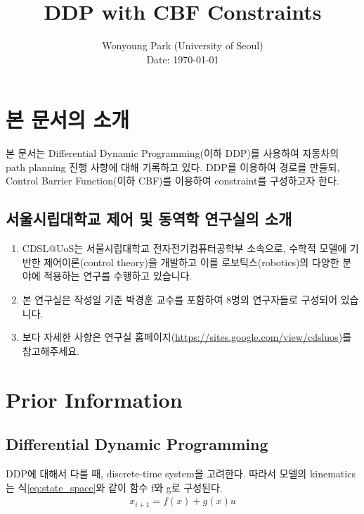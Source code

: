 \documentclass[journal]{IEEEtran}
\begin{document}
\title{DDP with CBF Constraints}

\author{Wonyoung Park (University of Seoul)\\ 
        Date: \today
        }

\maketitle

\section{본 문서의 소개}
본 문서는 Differential Dynamic Programming(이하 DDP)를 사용하여 자동차의 path planning 진행 사항에 대해 기록하고 있다. DDP를 이용하여 경로를 만들되, Control Barrier Function(이하 CBF)를 이용하여 constraint를 구성하고자 한다. 



\subsection{서울시립대학교 제어 및 동역학 연구실의 소개}


\begin{enumerate}
    \item CDSL@UoS는 서울시립대학교 전자전기컴퓨터공학부 소속으로, 수학적 모델에 기반한 제어이론(control theory)을 개발하고 이를 로보틱스(robotics)의 다양한 분야에 적용하는 연구를 수행하고 있습니다. 
    \item 본 연구실은 작성일 기준 박경훈 교수를 포함하여 8명의 연구자들로 구성되어 있습니다.
    \item 보다 자세한 사항은 연구실 홈페이지(\url{https://sites.google.com/view/cdsluos})를 참고해주세요. 
\end{enumerate}


\section{Prior Information}
\subsection{Differential Dynamic Programming}
DDP에 대해서 다룰 때, discrete-time system을 고려한다. 따라서 모델의 kinematics는 식\eqref{eq:state_space}와 같이 함수 f와 g로 구성된다.
\begin{align}
	x_{i+1}=f(x)+g(x)u
	\label{eq:state_space}
\end{align}
\end{document}
